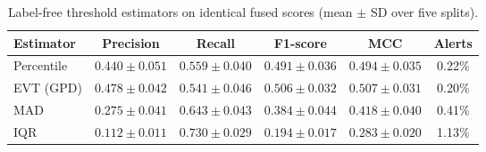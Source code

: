 \begin{table}[t]
\centering
\caption{Label-free threshold estimators on identical fused scores (mean $\pm$ SD over five splits).}
\label{tab:threshold}
\begin{tabular}{lccccc}
\toprule
Estimator & Precision & Recall & F1-score & MCC & Alerts \\
\midrule
Percentile & $0.440\pm0.051$ & $0.559\pm0.040$ & $0.491\pm0.036$ & $0.494\pm0.035$ & 0.22\% \\
EVT (GPD) & $0.478\pm0.042$ & $0.541\pm0.046$ & $0.506\pm0.032$ & $0.507\pm0.031$ & 0.20\% \\
MAD & $0.275\pm0.041$ & $0.643\pm0.043$ & $0.384\pm0.044$ & $0.418\pm0.040$ & 0.41\% \\
IQR & $0.112\pm0.011$ & $0.730\pm0.029$ & $0.194\pm0.017$ & $0.283\pm0.020$ & 1.13\% \\
\bottomrule
\end{tabular}
\end{table}
